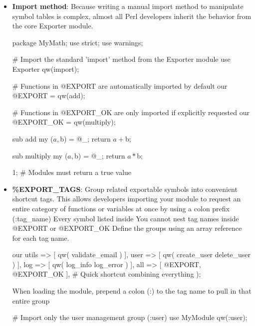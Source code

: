 \documentclass{report}
\begin{document}
\begin{itemize}
\begin{perlcode}
                # --- main.pl ---
                use MyModule;

                # say_hello();       # This will crash! Perl doesn't know what say_hello is.
                MyModule::say_hello(); #  This works perfectly.
            \end{perlcode}
        \item \textbf{Import method}: Because writing a manual import method to manipulate symbol tables is complex, almost all Perl developers inherit the behavior from the core Exporter module.
            \bigbreak \noindent 
            \begin{perlcode}
                package MyMath;
                use strict;
                use warnings;

                # Import the standard 'import' method from the Exporter module
                use Exporter qw(import);

                # Functions in @EXPORT are automatically imported by default
                our @EXPORT = qw(add);

                # Functions in @EXPORT_OK are only imported if explicitly requested
                our @EXPORT_OK = qw(multiply);

                sub add {
                    my ($a, $b) = @_;
                    return $a + $b;
                }

                sub multiply {
                    my ($a, $b) = @_;
                    return $a * $b;
                }

                1; # Modules must return a true value
            \end{perlcode}
        \item \textbf{\%EXPORT\_TAGS}: Group related exportable symbols into convenient shortcut tags. This allows developers importing your module to request an entire category of functions or variables at once by using a colon prefix (:tag\_name)
            \bigbreak \noindent 
            Every symbol listed inside %
            \bigbreak \noindent 
            You cannot nest tag names inside @EXPORT or @EXPORT\_OK
            \bigbreak \noindent 
            Define the groups using an array reference for each tag name.
            \bigbreak \noindent 
            \begin{perlcode}
            our %
                utils => [ qw( validate_email ) ],
                user  => [ qw( create_user delete_user ) ],
                log   => [ qw( log_info log_error ) ],
                all   => [ @EXPORT, @EXPORT_OK ], # Quick shortcut combining everything
            );
            \end{perlcode}
            \bigbreak \noindent 
            When loading the module, prepend a colon (:) to the tag name to pull in that entire group
            \bigbreak \noindent 
            \begin{perlcode}
                # Import only the user management group (:user)
                use MyModule qw(:user); 


\end{perlcode}
\end{itemize}
\end{document}
